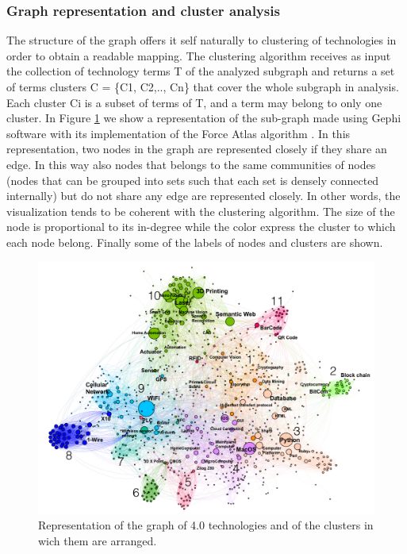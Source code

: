 \documentclass[b5paper,]{book}
\theoremstyle{definition}
\theoremstyle{definition}
\theoremstyle{definition}
\theoremstyle{remark}
\begin{document}
\subsubsection*{Graph representation and cluster
analysis}\label{graph-representation-and-cluster-analysis}

The structure of the graph offers it self naturally to clustering of
technologies in order to obtain a readable mapping. The clustering
algorithm receives as input the collection of technology terms T of the
analyzed subgraph and returns a set of terms clusters C = \{C1, C2,..,
Cn\} that cover the whole subgraph in analysis. Each cluster Ci is a
subset of terms of T, and a term may belong to only one cluster. In
Figure \ref{fig:technimetro} we show a representation of the sub-graph
made using Gephi software with its implementation of the Force Atlas
algorithm \citep{ICWSM09154} . In this representation, two nodes in the
graph are represented closely if they share an edge. In this way also
nodes that belongs to the same communities of nodes (nodes that can be
grouped into sets such that each set is densely connected internally)
but do not share any edge are represented closely. In other words, the
visualization tends to be coherent with the clustering algorithm. The
size of the node is proportional to its in-degree while the color
express the cluster to which each node belong. Finally some of the
labels of nodes and clusters are shown.

\begin{figure}

{\centering \includegraphics[width=1\linewidth]{_bookdown_files/figures/Graph_Tech.001} 

}

\caption{ Representation of the graph of 4.0 technologies and of the clusters in wich them are arranged.}\label{fig:technimetro}
\end{figure}
\end{document}
